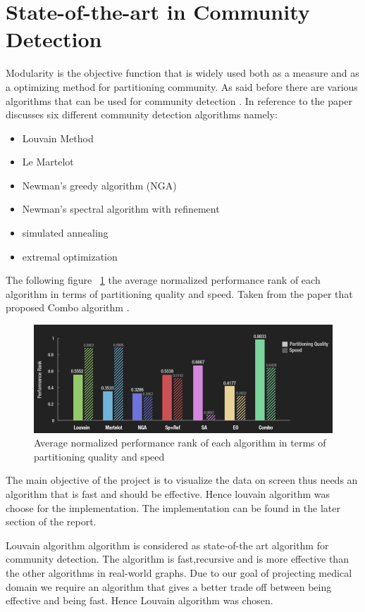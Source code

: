 \section{State-of-the-art in Community Detection}
Modularity is the objective function that is widely used both as a measure and as a optimizing method for partitioning community.
As said before there are various algorithms that can be used for community detection . In reference to the paper \cite{generalcommunity} discusses six different community detection algorithms namely: 
\begin{itemize}
\item Louvain Method
\item Le Martelot
\item Newman’s greedy algorithm (NGA)
\item Newman’s spectral algorithm with refinement
\item simulated annealing
\item extremal optimization
\end{itemize}
The following figure ~\ref{Fig1} the average normalized performance rank of each algorithm in terms of partitioning quality and speed. Taken from the paper that proposed Combo algorithm \cite{generalcommunity}. 
\begin{figure}[h]
\centering
\includegraphics[scale=0.5]{lou.png}
\caption{\label{Fig1}Average normalized performance rank of each algorithm in terms of partitioning quality and speed}

\end{figure}
The main objective of the project is to visualize the data on screen thus needs an algorithm that is fast and should be effective.  Hence louvain algorithm was choose for the implementation. The implementation can be found in the later section of the report.


Louvain algorithm algorithm is considered as state-of-the art algorithm for community detection\cite{louvain}. The algorithm is fast,recursive and is more effective than the other algorithms in real-world graphs. Due to our goal of projecting medical domain we require an algorithm that gives a better trade off between being effective and being fast. Hence Louvain algorithm was chosen.

